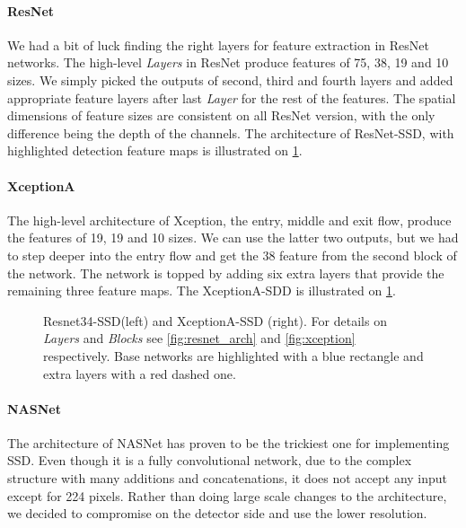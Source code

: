 \paragraph{ResNet} We had a bit of luck finding the right layers for feature extraction in ResNet networks. The high-level \textit{Layers} in ResNet produce features of 75, 38, 19 and 10 sizes. We simply picked the outputs of second, third and fourth layers and added appropriate feature layers after last \textit{Layer} for the rest of the features. The spatial dimensions of feature sizes are consistent on all ResNet version, with the only difference being the depth of the channels. The architecture of ResNet-SSD, with highlighted detection feature maps is illustrated on \cref{fig:resnet_xception_SSD}.

\paragraph{XceptionA} The high-level architecture of Xception, the entry, middle and exit flow, produce the features of 19, 19 and 10 sizes. We can use the latter two outputs, but we had to step deeper into the entry flow and get the 38 feature from the second block of the network. The network is topped by adding six extra layers that provide the remaining three feature maps. The XceptionA-SDD is illustrated on \cref{fig:resnet_xception_SSD}.


\begin{figure}
    \centering
    \resnetSSD
    \caption[Resnet34-SSD and Xception-SSD]%
    {Resnet34-SSD(left) and XceptionA-SSD (right). For details on \textit{Layers} and \textit{Blocks} see \cref{fig:resnet_arch} and \cref{fig:xception} respectively. Base networks are highlighted with a blue rectangle and extra layers with a red dashed one.}

    \label{fig:resnet_xception_SSD}
\end{figure}

\paragraph{NASNet} The architecture of NASNet has proven to be the trickiest one for implementing SSD. Even though it is a fully convolutional network, due to the complex structure with many additions and concatenations, it does not accept any input except for 224 pixels. Rather than doing large scale changes to the architecture, we decided to compromise on the detector side and use the lower resolution. 

